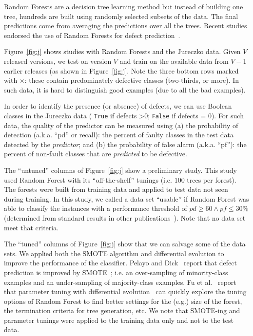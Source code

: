\documentclass[twocolumn,5p]{elsarticle}
\newcommand{\fig}[1]{Figure~\ref{fig:#1}}
\theoremstyle{break}
\begin{document}
\begin{itemize}
		Random Forests are a decision tree learning method but
		instead of building one tree, hundreds are built using
		randomly selected subsets of the data. The final predictions
		come from averaging the predictions over all the trees.
		Recent studies endorsed the use
		of  Random Forests for  defect prediction~\cite{lessmann}.
		
		\fig{j} shows   studies with Random Forests and
		the Jureczko data. Given   $V$ released versions, we test on version $V$ and train on the available data from $V-1$ earlier releases (as shown in \fig{j}. Note the   \colorbox{lavenderpink}{three bottom rows}   marked with $\times$: these contain predominately defective classes (two-thirds, or more).  In such data, it is hard to distinguish good examples (due to all the bad examples). 
		
		In order to identify the presence (or absence) of defects, we can   use Boolean classes in the  Jureczko data ( \texttt{True} if defects \textgreater 0; \texttt{False} if defects = 0). For such data, the quality of the predictor can be measured using (a) the  probability of detection (a.k.a. ``pd'' or recall):  the percent of faulty classes in the test data detected by the {\em predictor}; and (b) the  probability of false alarm (a.k.a. ``pf''): the percent of non-fault classes that are {\em predicted} to be defective.
		
		The ``untuned'' columns of \fig{j}
		show a preliminary study. This study used
		Random Forest with its ``off-the-shelf'' tunings (i.e.  
		100 trees per forest).  
		The forests were built from training data and applied to test data
		not seen during training.  In this
		study, we called a data set ``usable'' if   Random Forest was able to classify the instances with a performance threshold of $\mathit{pd}\ge 60 \wedge \mathit{pf} \le 30$\% (determined from standard results in other publications~\cite{me07b}). Note that no  data set meet
		that criteria.
		
		The ``tuned'' columns of \fig{j} show that we can salvage some of the data sets. We applied both the SMOTE algorithm and differential evolution to improve the performance of the classifier. Pelayo and Dick~\cite{pelayo07} report that defect prediction is improved by SMOTE~\cite{Chawla2002}; i.e. an over-sampling of minority-class examples and an under-sampling of majority-class examples. Fu et al.~\cite{fu:ase15} report that parameter tuning with differential evolution~\cite{storn97} can quickly explore the tuning options of Random Forest to find better settings for the (e.g.) size of the forest, the termination criteria
		for tree generation, etc. We note that SMOTE-ing and
		parameter tunings were applied to the training data only and not to the test data.
		

\end{itemize}
\end{document}
